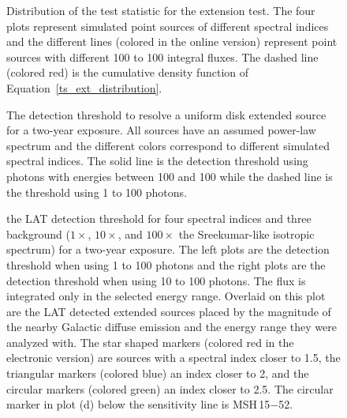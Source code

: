 \documentclass[12pt,preprint]{aastex}
\newif\ifcolorfigure
\newcommand{\mev}{\text{MeV}\xspace}
\newcommand{\gev}{\text{GeV}\xspace}
\begin{document}
\clearpage
\begin{figure}
    \ifcolorfigure
    \plotone{mc_plots/ts_ext_emin_1000_color.eps}
    \else
    \fi
    \caption{
    Distribution of the test statistic for the extension test.
    The four plots
    represent simulated point sources of different spectral indices and
    the different lines (colored in the online version) 
    represent point sources with different 100 \mev
    to 100 \gev integral fluxes.  The dashed line (colored red)
    is the cumulative
    density function of Equation~\ref{ts_ext_distribution}.
    }\label{ts_ext_mc}
  \end{figure}

\clearpage

\begin{figure}
    \ifcolorfigure
    \plotone{mc_plots/index_sensitivity_color.eps}
    \else
    \fi
    \caption{
    The detection threshold to resolve a
    uniform disk extended source for a two-year exposure.  All sources
    have an assumed power-law spectrum and the different colors correspond
    to different simulated spectral indices.  The solid line is the
    detection threshold using photons with energies between 100 \mev and 100
    \gev while the dashed line is the threshold using 1 \gev to 100 \gev photons.
    }\label{index_sensitivity}
  \end{figure}

\clearpage
\begin{figure}
    \ifcolorfigure
    \plotone{mc_plots/all_sensitivity_color.eps}
    \else
    \fi
    \caption{the LAT detection threshold for four spectral indices
    and three background ($1\times$, $10\times$, and $100\times$ the
    Sreekumar-like isotropic spectrum) for a two-year exposure. The
    left plots are the detection threshold when using 1 \gev to 100 \gev
    photons and the right plots are the detection threshold when using
    10 \gev to 100 \gev photons.  The flux is integrated only in the
    selected energy range.  Overlaid on this plot are the LAT detected
    extended sources placed by the magnitude of the nearby Galactic
    diffuse emission and the energy range they were analyzed with.
    The star shaped markers (colored red in the electronic version)
    are sources with a spectral index closer to 1.5, the triangular
    markers (colored blue) an index closer to 2, and the circular markers
    (colored green) an index closer to 2.5.  The circular marker in plot
    (d) below the sensitivity line is MSH\,15$-$52.
    }\label{all_sensitivity} 
  \end{figure}
\end{document}
